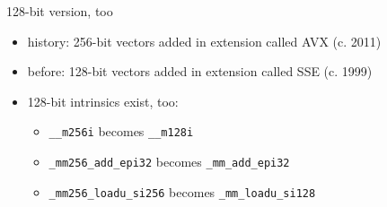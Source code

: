 \begin{frame}[fragile,label=vect128]{128-bit version, too}
\begin{itemize}
\item history: 256-bit vectors added in extension called AVX (c. 2011)
\item before: 128-bit vectors added in extension called SSE (c. 1999)
\vspace{.5cm}
\item 128-bit intrinsics exist, too:
    \begin{itemize}
    \item \texttt{\_\_m256i} becomes \texttt{\_\_m128i}
    \item \texttt{\_mm256\_add\_epi32} becomes \texttt{\_mm\_add\_epi32}
    \item \texttt{\_mm256\_loadu\_si256} becomes \texttt{\_mm\_loadu\_si128}
    \end{itemize}
\end{itemize}
\end{frame}
